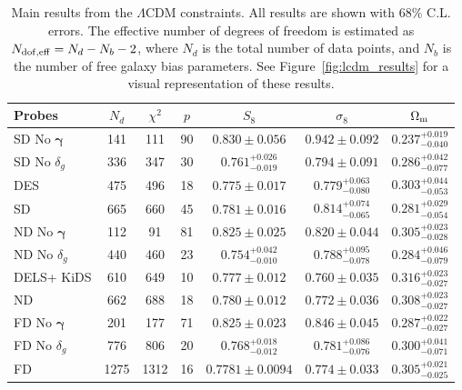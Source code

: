 \documentclass[a4paper,11pt]{article}
\newcommand{\Om}{\Omega_{\rm m}}
\newcommand{\shear}{\boldsymbol{\gamma}}
\newcommand{\lcdm}{$\Lambda$CDM\xspace}
\newcommand{\des}{DES\xspace}
\newcommand{\kids}{KiDS\xspace}
\newcommand{\dls}{DELS\xspace}
\newcommand{\northd}{ND\xspace}
\newcommand{\southd}{SD\xspace}
\newcommand{\alld}{FD\xspace}
\begin{document}
     \begin{table}
        \centering
        \def\arraystretch{1.2}
        \begin{tabular}{|lcccccc|}
        \hline
        Probes        &  $N_d$  & $\chi^2$ & $p$  & $S_8$  & $\sigma_8$ & $\Om$\\
        \hline 
        \southd No $\shear$ & 141 & 111 & 90 & $ 0.830\pm 0.056$ & $ 0.942\pm 0.092$ & $ 0.237^{+0.019}_{-0.040}$ \\
        \southd No $\delta_g$ & 336 & 347 & 30 & $ 0.761^{+0.026}_{-0.019}$ & $ 0.794\pm 0.091$ & $ 0.286^{+0.042}_{-0.077}$ \\
        \des & 475 & 496 & 18 & $ 0.775\pm 0.017$ & $ 0.779^{+0.063}_{-0.080}$ & $ 0.303^{+0.044}_{-0.053}$ \\
        \southd  & 665 & 660 & 45 & $ 0.781\pm 0.016$ & $ 0.814^{+0.074}_{-0.065}$ & $ 0.281^{+0.029}_{-0.054}$\\
        \hline
        \northd No $\shear$ & 112 & 91 & 81 & $ 0.825\pm 0.025$ & $ 0.820\pm 0.044$ & $ 0.305^{+0.023}_{-0.028}$ \\
        \northd No $\delta_g$ & 440 & 460 & 23 & $ 0.754^{+0.042}_{-0.010}$ & $ 0.788^{+0.095}_{-0.078}$ & $ 0.284^{+0.046}_{-0.079}$ \\
        \dls + \kids & 610 & 649 & 10 & $ 0.777\pm 0.012$ & $ 0.760\pm 0.035$ & $ 0.316^{+0.023}_{-0.027}$ \\
        \northd & 662 & 688 & 18 & $ 0.780\pm 0.012$ & $ 0.772\pm 0.036$ & $ 0.308^{+0.023}_{-0.027}$ \\
        \hline
        \alld No $\shear$ & 201 & 177 & 71 & $ 0.825\pm 0.023$ & $ 0.846\pm 0.045$ & $ 0.287^{+0.022}_{-0.027}$ \\
        \alld No $\delta_g$ & 776 & 806 & 20 & $ 0.768^{+0.018}_{-0.012}$ & $ 0.781^{+0.086}_{-0.076}$ & $ 0.300^{+0.041}_{-0.071}$ \\
        \alld & 1275 & 1312 & 16 & $ 0.7781\pm 0.0094$ & $ 0.774\pm 0.033$ & $ 0.305^{+0.021}_{-0.025}$ \\
        \hline
        \end{tabular}
        \caption{Main results from the \lcdm constraints. All results are shown with 68\% C.L. errors. The effective number of degrees of freedom is estimated as $N_{\rm dof,eff}=N_d-N_b-2$, where $N_d$ is the total number of data points, and $N_b$ is the number of free galaxy bias parameters. See Figure~\ref{fig:lcdm_results} for a visual representation of these results.}\label{tab:chi2}
      \end{table}
      
\end{document}

